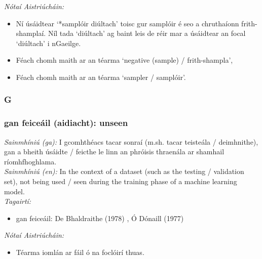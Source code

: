  \noindent \textit{Nótaí Aistriúcháin:}
\begin{itemize}
	\item Ní úsáidtear `*samplóir diúltach' toisc gur samplóir é seo a chruthaíonn frith-shamplaí. Níl tada `diúltach' ag baint leis de réir mar a úsáidtear an focal `diúltach' i nGaeilge.
	\item Féach chomh maith ar an téarma `negative (sample) / frith-shampla',
	\item Féach chomh maith ar an téarma `sampler / samplóir'.
\end{itemize}


 \subsubsection*{G}

\subsubsection*{gan feiceáil (aidiacht): unseen}
 \noindent \textit{Sainmhíniú (ga):} I gcomhthéacs tacar sonraí (m.sh. tacar teisteála / deimhnithe), gan a bheith úsáidte / feicthe le linn an phróisis thraenála ar shamhail ríomhfhoghlama.
\\
 \noindent \textit{Sainmhíniú (en):} In the context of a dataset (such as the testing / validation set), not being used / seen during the training phase of a machine learning model.
\\
 \noindent \textit{Tagairtí:}
\begin{itemize}
	\item gan feiceáil: De Bhaldraithe (1978) \cite{de-bhaldraithe}, Ó Dónaill (1977) \cite{odonaill}
\end{itemize}

 \noindent \textit{Nótaí Aistriúcháin:}
\begin{itemize}
	\item Téarma iomlán ar fáil ó na foclóirí thuas.
\end{itemize}


